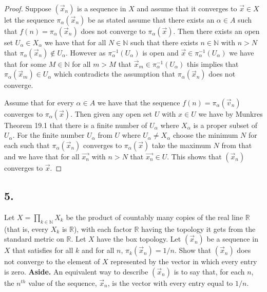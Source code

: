 \documentclass{amsart}
\theoremstyle{plain}
\theoremstyle{definition}
\theoremstyle{remark}
\begin{document}
\begin{proof}
    Suppose $(\vec{x}_n)$ is a sequence in $X$ and assume that it converges to $\vec{x}\in X$ let the sequence $\pi_\alpha(\vec{x}_n)$ be as stated assume that there exists an $\alpha \in A$ such that $f(n)=\pi_\alpha(\vec x_n)$ does not converge to $\pi_\alpha(\vec x)$. Then there exists an open set $U_\alpha\in X_\alpha$ we have that for all $N\in \mathbb{N}$ such that there exists $n\in \mathbb{N}$ with $n>N$ that $\pi_\alpha(\vec x_n)\not \in U_\alpha$. However as $\pi_\alpha^{-1}(U_\alpha)$ is open and $\vec{x} \in \pi_\alpha^{-1}(U_\alpha)$ we have that for some $M\in \mathbb{N}$ for all $m>M$  that $\vec x_m\in \pi_\alpha^{-1}(U_\alpha)$ this implies that $\pi_\alpha(\vec x_m) \in U_\alpha$ which contradicts the assumption that $\pi_\alpha(\vec x_n)$ does not converge. 
    
    Assume that for every $\alpha\in A$ we have that the sequence $f(n)=\pi_\alpha(\vec v_n)$ converges to $\pi_{\alpha}(\vec x)$. Then given any open set $U$ with $x\in U$ we have by Munkres Theorem 19.1 that there is a finite number of $U_\alpha$ where $X_\alpha$ is a proper subset of $U_\alpha$. For the finite number $U_\alpha$ from $U$ where $U_\alpha\not = X_\alpha$ choose the minimum $N$ for each such that $\pi_\alpha(\vec{x}_n)$ converges to $\pi_\alpha(\vec{x})$ take the maximum $N$ from that and we have that for all $\vec{x_n}$ with $n>N$ that $\vec{x_n}\in U$. This shows that $(\vec x_n)$ converges to $\vec x$.
\end{proof}


\vspace{.15in}

\noindent
\subsection*{5.} Let $X =\prod _{k\in \mathbb N} X_k$ be the product of countably many copies of the real line $\mathbb R$  (that is, every $X_k$ is $\mathbb R$), with each factor $\mathbb R$ having the topology it gets from the standard metric on $\mathbb R$. Let $X$ have the box topology. Let $(\vec{x}_n)$ be a sequence in $X$ that satisfies for all $k$ and for all $n$, $\pi_k  (\vec{x}_n) = 1/n$. Show that $(\vec{x}_n)$ does not converge to the element of $X$ represented by the vector in which every entry is zero. {\bfseries Aside.} An equivalent way to describe $(\vec{x}_n)$ is to say that, for each $n$, the $n^{th}$ value of the sequence, $\vec{x}_n$, is the vector with every entry equal to $1/n$.
\end{document}
